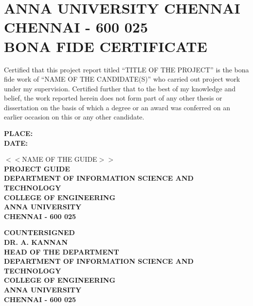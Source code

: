 \documentclass[13 pt,a4paper]{aureportm}
\begin{document}
\chapter*{ANNA UNIVERSITY CHENNAI\\
CHENNAI - 600 025\\
BONA FIDE CERTIFICATE}
\newlength{\aulength}
\settowidth{\aulength}{Anna University
  Chennai}
\newlength{\datewidth}
\settowidth{\datewidth}{Chennai 600 025}

\begin{spacing}{1.5}
  \begin{sloppypar}
  \fontsize{14}{17}\selectfont Certified that this project report titled ``TITLE OF THE PROJECT'' is the bona fide work of ``NAME OF THE CANDIDATE(S)'' who carried out project work under my supervision. Certified further that to the best of my knowledge and belief, the work reported herein does not form part of any other thesis or dissertation on the basis of which a degree or an award was conferred on an earlier occasion on this or any other candidate.
  \end{sloppypar}
\end{spacing}

\begin{flushleft}
 \parbox[t]{\datewidth}{\small{\textbf{PLACE: }}\\
 \small{\textbf{DATE: }}}
 \hfill
 \parbox[t]{9 cm}{\scriptsize{$<<$NAME OF THE GUIDE$>>$} \\
 \scriptsize{\textbf{PROJECT GUIDE}}\\
 \scriptsize{\textbf{DEPARTMENT OF INFORMATION SCIENCE AND TECHNOLOGY}}\\
 \scriptsize{\textbf{COLLEGE OF ENGINEERING}}\\
 \scriptsize{\textbf{ANNA UNIVERSITY}}   \\
 \scriptsize{\textbf{CHENNAI - 600 025}}
 }
\end{flushleft}
\vspace{0.5 cm}
\begin{center}
 \small{\textbf{COUNTERSIGNED}}\\ 
  \vspace{1 cm}
  \textbf{\scriptsize{DR. A. KANNAN}}\\ 
  \scriptsize{\textbf{HEAD OF THE DEPARTMENT}}\\
 \scriptsize{\textbf{DEPARTMENT OF INFORMATION SCIENCE AND TECHNOLOGY}}\\
 \scriptsize{\textbf{COLLEGE OF ENGINEERING}}\\
 \scriptsize{\textbf{ANNA UNIVERSITY}}   \\
 \scriptsize{\textbf{CHENNAI - 600 025}}
 
\end{center}
\end{document}
